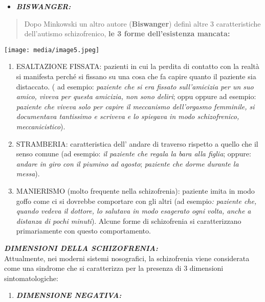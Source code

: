 \documentclass[]{article}
\begin{document}
\begin{itemize}
\item
  \textbf{\emph{BISWANGER:}}
\end{itemize}

\begin{quote}
Dopo Minkowski un altro autore (\textbf{Biswanger}) definì altre 3
caratteristiche dell'autismo schizofrenico, \textbf{le 3 forme
dell'esistenza mancata:}
\end{quote}

\texttt{[image: media/image5.jpeg]}

\begin{enumerate}
\def\labelenumi{\arabic{enumi}.}
\item
  ESALTAZIONE FISSATA: pazienti in cui la perdita di contatto con la
  realtà si manifesta perché si fissano su una cosa che fa capire quanto
  il paziente sia distaccato. ( ad esempio: \emph{paziente che si era
  fissato sull'amicizia per un suo amico, viveva per questa amicizia,
  non sono deliri}; oppu oppure ad esempio: \emph{paziente che viveva
  solo per capire il meccanismo dell'orgasmo femminile, si documentava
  tantissimo e scriveva e lo spiegava in modo schizofrenico,
  meccanicistico}).
\item
  STRAMBERIA: caratteristica dell' andare di traverso rispetto a quello
  che il senso comune (ad esempio: \emph{il paziente che regala la bara
  alla figlia}; oppure: \emph{andare in giro con il piumino ad agosto};
  \emph{paziente che dorme durante la messa}).
\item
  MANIERISMO (molto frequente nella schizofrenia): paziente imita in
  modo goffo come ci si dovrebbe comportare con gli altri (ad
  esempio\emph{: paziente che, quando vedeva il dottore, lo salutava in
  modo esagerato ogni volta, anche a distanza di pochi minuti}). Alcune
  forme di schizofrenia si caratterizzano primariamente con questo
  comportamento.
\end{enumerate}

\textbf{\emph{DIMENSIONI DELLA SCHIZOFRENIA:}}\\
Attualmente, nei moderni sistemi nosografici, la schizofrenia viene
considerata come una sindrome che si caratterizza per la presenza di 3
dimensioni sintomatologiche:

\begin{enumerate}
\def\labelenumi{\arabic{enumi}.}
\item
  \textbf{\emph{DIMENSIONE NEGATIVA:}}
\end{enumerate}
\end{document}
